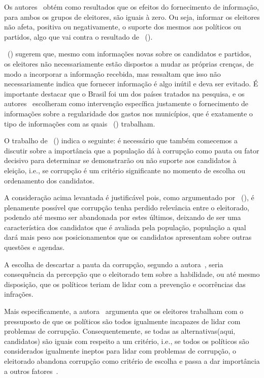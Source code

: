\documentclass[
	12pt,				%
	openright,			%
	twoside,			%
	a4paper,			%
	openany,
	english,			%
	brazil				%
	]{abntex2}
\begin{document}
Os autores~\cite{dunning2019voter} obtém como resultados que os efeitos do fornecimento de informação, para ambos os grupos de eleitores, são iguais à zero. Ou seja, informar os eleitores não afeta, positiva ou negativamente, o suporte dos mesmos aos políticos ou partidos, algo que vai contra o resultado de ~(\citeyear{ferraz2008exposing}).

~(\citeyear{dunning2019voter}) sugerem que, mesmo com informações novas sobre os candidatos e partidos, os eleitores não necessariamente estão dispostos a mudar as próprias crenças, de modo a incorporar a informação recebida, mas ressaltam que isso não necessariamente indica que fornecer informação é algo inútil e deva ser evitado. É importante destacar que o Brasil foi um dos países tratados na pesquisa, e os autores~\cite{dunning2019voter} escolheram como intervenção específica justamente o fornecimento de informações sobre a regularidade dos gastos nos municípios, que é exatamente o tipo de informações com as quais ~(\citeyear{ferraz2008exposing}) trabalham.

O trabalho de ~(\citeyear{dunning2019voter}) indica o seguinte: é necessário que também comecemos a discutir sobre a importância que a população dá à corrupção como pauta ou fator decisivo para determinar se demonstrarão ou não suporte aos candidatos à eleição, i.e., se corrupção é um critério significante no momento de escolha ou ordenamento dos candidatos.

A consideração acima levantada é justificável pois, como argumentado por ~(\citeyear{Pavao2018Jul}), é plenamente possível que corrupção tenha perdido relevância entre o eleitorado, podendo até mesmo ser abandonada por estes últimos, deixando de ser uma característica dos candidatos que é avaliada pela população, população a qual dará mais peso aos posicionamentos que os candidatos apresentam sobre outras questões e agendas.

A escolha de descartar a pauta da corrupção, segundo a autora~\cite{Pavao2018Jul}, seria consequência da percepção que o eleitorado tem sobre a habilidade, ou até mesmo disposição, que os políticos teriam de lidar com a prevenção e ocorrências das infrações.

Mais especificamente, a autora~\cite{Pavao2018Jul} argumenta que os eleitores trabalham com o pressuposto de que os políticos são todos igualmente incapazes de lidar com problemas de corrupção. Consequentemente, se todas as alternativas(aqui, candidatos) são iguais com respeito a um critério, i.e., se todos os políticos são considerados igualmente ineptos para lidar com problemas de corrupção, o eleitorado abandona corrupção como critério de escolha e passa a dar importância a outros fatores~\cite{Pavao2018Jul}.
\end{document}
